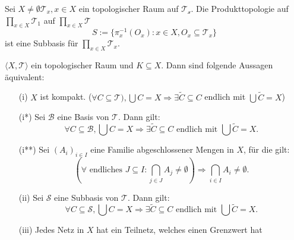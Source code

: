  \ex{}
 {
Sei $X \neq \emptyset \mathcal{T}_x, x \in X$  ein topologischer Raum 
 auf $\mathcal{T_x}$.
 Die Produkttopologie auf $ \prod_{x \in X} \mathcal{T}_1$ auf 
 $\prod_{x \in X} \mathcal{T}$
 $$
 S:= \{ \pi_x^{-1}(O_x) : x \in X, O_x \subseteq \mathcal{T}_x \}
 $$
    ist eine Subbasis für $\prod_{x \in X} \mathcal{T}_x$.
 }

\thm{}
{
    $\langle X, \mathcal{T} \rangle$ ein topologischer Raum und 
    $K \subseteq X$. Dann sind folgende Aussagen äquivalent:
    \begin{itemize}
        \item[(i)] $X$ ist kompakt. 
        ($\forall C \subseteq \mathcal{T}), 
        \bigcup C = X \Rightarrow \exists \tilde{C} 
        \subseteq C$ endlich mit $\bigcup \tilde{C} = X$)
        \item[(i*)] Sei $\mathcal{B}$ eine Basis von $\mathcal{T}$.
        Dann gilt:
        $$
        \forall C \subseteq \mathcal{B}, 
        \bigcup C = X \Rightarrow \exists \tilde{C} 
        \subseteq C \text{ endlich mit } \bigcup \tilde{C} = X .
        $$
        \item[(i**)] Sei $(A_i)_{i \in I}$ eine Familie abgeschlossener 
        Mengen in 
        $X$, für die gilt:
        $$
        (\forall \text{ endliches } J \subseteq I :
        \bigcap_{j \in J} A_j \neq \emptyset) \Rightarrow
        \bigcap_{i \in I} A_i \neq \emptyset .
        $$
        \item[(ii)] Sei $\mathcal{S}$ eine Subbasis von $\mathcal{T}$.
        Dann gilt:
        $$
        \forall C \subseteq \mathcal{S}, 
        \bigcup C = X \Rightarrow \exists \tilde{C} 
        \subseteq C \text{ endlich mit } \bigcup \tilde{C} = X .
        $$  
        \item[(iii)] Jedes Netz in $X$ hat ein Teilnetz,
         welches einen Grenzwert hat
    \end{itemize}
}

